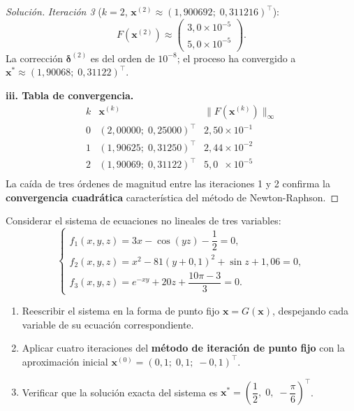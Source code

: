 \documentclass[a4,11pt]{aleph-notas}
\begin{document}
\begin{proof}[Solución]
\textit{Iteración 3} ($k=2$, $\mathbf{x}^{(2)}\approx(1{,}900692;\;0{,}311216)^\top$):
\[
    F\!\left(\mathbf{x}^{(2)}\right)
    \approx \begin{pmatrix} 3{,}0\times10^{-5}\\ 5{,}0\times10^{-5} \end{pmatrix}.
\]
La corrección $\boldsymbol{\delta}^{(2)}$ es del orden de $10^{-8}$;
el proceso ha convergido a $\mathbf{x}^*\approx(1{,}90068;\;0{,}31122)^\top$.

\medskip
\textbf{iii. Tabla de convergencia.}
\[
    \begin{array}{c|c|c}
        k & \mathbf{x}^{(k)} & \bigl\|F\!\left(\mathbf{x}^{(k)}\right)\bigr\|_\infty \\ \hline
        0 & (2{,}00000;\;0{,}25000)^\top & 2{,}50\times10^{-1} \\
        1 & (1{,}90625;\;0{,}31250)^\top & 2{,}44\times10^{-2} \\
        2 & (1{,}90069;\;0{,}31122)^\top & 5{,}0\phantom{0}\times10^{-5} \\
    \end{array}
\]
La caída de tres órdenes de magnitud entre las iteraciones 1 y 2 confirma la
\textbf{convergencia cuadrática} característica del método de Newton-Raphson.

\end{proof}


\begin{ejer}
    Considerar el sistema de ecuaciones no lineales de tres variables:
    \[
        \begin{cases}
            f_1(x,y,z) = 3x - \cos(yz) - \dfrac{1}{2} = 0,\\[8pt]
            f_2(x,y,z) = x^2 - 81(y+0{,}1)^2 + \sin z + 1{,}06 = 0,\\[8pt]
            f_3(x,y,z) = e^{-xy} + 20z + \dfrac{10\pi-3}{3} = 0.
        \end{cases}
    \]
    \begin{enumerate}
        \item Reescribir el sistema en la forma de punto fijo $\mathbf{x}=G(\mathbf{x})$,
              despejando cada variable de su ecuación correspondiente.
        \item Aplicar cuatro iteraciones del \textbf{método de iteración de punto fijo}
              con la aproximación inicial
              $\mathbf{x}^{(0)}=(0{,}1;\;0{,}1;\;-0{,}1)^\top$.
        \item Verificar que la solución exacta del sistema es
              $\mathbf{x}^*=\!\left(\dfrac{1}{2},\;0,\;-\dfrac{\pi}{6}\right)^{\!\top}$.
    \end{enumerate}
\end{ejer}
\end{document}
